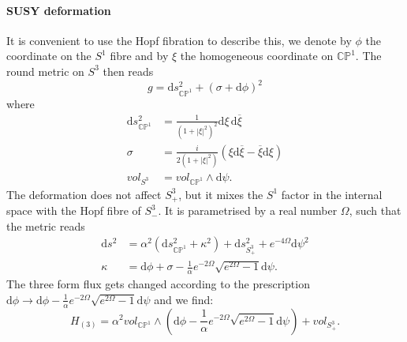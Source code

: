 \documentclass[a4paper, 11pt]{article}
\numberwithin{equation}{section}
\newcommand{\ov}[1]{\overline{#1}}
\newcommand{\+}{\oplus}
\renewcommand{\d}{\ensuremath{\mathrm{d}}\xspace}
\newcommand{\CE}[1]{\textcolor{darkorange}{#1}}
\begin{document}
\paragraph{SUSY deformation}


It is convenient to use the Hopf fibration to describe this, we denote by $\phi$ the coordinate on the $S^1$ fibre and by $\xi$ the homogeneous coordinate on $\mathbb{CP}^1$. The round metric on $S^3$ then reads
\begin{equation}
	g= \mathrm{d}s^2_{\mathbb{CP}^1} + (\sigma + \mathrm{d}\phi)^2
\end{equation}
where 
\begin{equation}
	\begin{split}
		\mathrm{d}s^2_{\mathbb{CP}^1} &= \frac1{(1+|\xi|^2)^2}\mathrm{d}\xi\,\mathrm{ d}\ov{\xi}\\
		\sigma&=\frac{i}{2(1+|\xi|^2)}(\xi \mathrm{d} \ov{\xi}-\ov{\xi}\mathrm{d}\xi)\\ 
		vol_{S^3}&=vol_{\mathbb{CP}^1}\wedge \mathrm{d}\psi .
	\end{split}
\end{equation}
The deformation does not affect $S_+^3$, but it mixes the $S^1$ factor in the internal space with the Hopf fibre of $S_-^3$. It is parametrised by a real number $\Omega$, such that the metric reads
\begin{equation}
	\begin{split}
		\mathrm{d}s^2 &= \alpha^2(\mathrm{d}s^2_{\mathbb{CP}^1}+\kappa^2) + \mathrm{d}s^2_{S_+^3} + e^{-4\Omega}\mathrm{d}\psi^2\\
		\kappa &= \mathrm{d}\phi + \sigma - \frac1{\alpha}e^{-2\Omega}\sqrt{e^{2\Omega}-1}\d\psi.
	\end{split}
\end{equation}
 The three form flux gets changed according to the prescription $\d\phi \rightarrow \d\phi -  \frac1{\alpha}e^{-2\Omega}\sqrt{e^{2\Omega}-1}\d \psi$ and we find:
\begin{equation}
	H_{(3)}=\alpha^2vol_{\mathbb{CP}^1}\wedge (\d\phi - \frac1{\alpha}e^{-2\Omega}\sqrt{e^{2\Omega}-1}\d\psi) + vol_{S_+^3}.
\end{equation}
\end{document}
